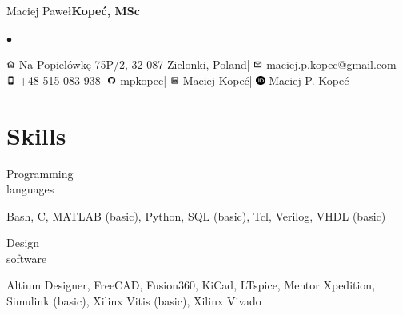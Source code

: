 \documentclass[11pt,a4paper]{article}
\makeatletter
\newcommand{\twhorline}[1]{\noindent\makebox[\linewidth]{\rule{\textwidth}{#1}}}
\newcommand{\cvskillsitem}[2]{

	\noindent
	\begin{minipage}{0.21\linewidth}
		\begin{flushleft}
			#1
		\end{flushleft}
	\end{minipage}
	\hfill
	\begin{minipage}{0.766\linewidth}

		\begin{flushleft}
			#2
		\end{flushleft}
	\end{minipage}
	\vspace{.65\baselineskip}
}
\newcommand{\firstname}{Maciej Paweł}
\newcommand{\familyname}{Kopeć}
\newcommand{\address}{Na Popielówkę 75P/2, 32-087 Zielonki, Poland}
\newcommand{\mobile}{+48 515 083 938}
\newcommand{\email}{\href{mailto:maciej.p.kopec@gmail.com}{maciej.p.kopec@gmail.com}}
\newcommand{\github}{\href{https://github.com/mpkopec}{mpkopec}}
\newcommand{\linkedin}{\href{https://www.linkedin.com/in/maciej-kope\%C4\%87-46735595/}{Maciej Kopeć}}
\newcommand{\orcid}{\href{https://orcid.org/0000-0002-1892-0417}{Maciej P. Kopeć}}
\makeatother
\begin{document}
	\begin{center}
		{\Huge \firstname \space \bfseries \familyname \normalfont, MSc}
		\vspace{1\baselineskip}

		\large
		\renewcommand*{\do}[1]{$\bullet$ #1 }
		$\bullet$
		\vspace{0.2\baselineskip}
		\twhorline{1pt}

		\vspace{0.25\baselineskip}
		\includegraphics[height=0.8em]{img/icons8-home-96.png}
		\address \space |
		\includegraphics[height=0.8em]{img/icons8-envelope-96.png}
		\email \\[.3em]

		\includegraphics[height=0.8em]{img/icons8-iphone-96.png}
		\mobile \space |
		\includegraphics[height=0.8em]{img/icons8-github-96.png}
		\github \space |
		\includegraphics[height=0.8em]{img/icons8-linkedin-96.png}
		\linkedin \space |
		\includegraphics[height=0.8em]{img/orcid-128.png}
		\orcid

		\twhorline{1pt}

	\end{center}

	\section{Skills}
	\cvskillsitem
	{Programming\\languages}
	{
		Bash,
		C,
		MATLAB (basic),
		Python,
		SQL (basic),
		Tcl,
		Verilog,
		VHDL (basic)
	}

	\cvskillsitem
	{Design\\software}
	{
		Altium Designer,
		FreeCAD,
		Fusion360,
		KiCad,
		LTspice,
		Mentor Xpedition,
		Simulink (basic),
		Xilinx Vitis (basic),
		Xilinx Vivado
	}
\end{document}
